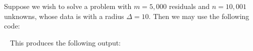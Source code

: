 \documentclass{galahad}
\begin{document}
\galexample
Suppose we wish to solve a problem with $m = 5,000$ residuals
and $n = 10,001$ unknowns, whose data is
with a radius $\Delta = 10$.
Then we may use the following code:

{\tt \small
\VerbatimInput{\packageexample}
}
\noindent
This produces the following output:
{\tt \small
\VerbatimInput{\packageresults}
}
\end{document}
